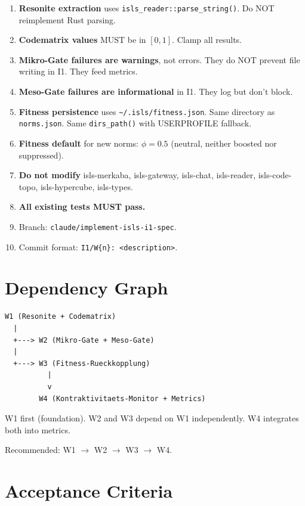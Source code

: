 \documentclass[11pt,a4paper]{article}
\begin{document}
\begin{enumerate}
\item \textbf{Resonite extraction} uses \texttt{isls\_reader::parse\_string()}. 
      Do NOT reimplement Rust parsing.
\item \textbf{Codematrix values} MUST be in $[0, 1]$. Clamp all results.
\item \textbf{Mikro-Gate failures are warnings}, not errors. They 
      do NOT prevent file writing in I1. They feed metrics.
\item \textbf{Meso-Gate failures are informational} in I1. 
      They log but don't block.
\item \textbf{Fitness persistence} uses \texttt{\textasciitilde/.isls/fitness.json}. 
      Same directory as \texttt{norms.json}. Same 
      \texttt{dirs\_path()} with USERPROFILE fallback.
\item \textbf{Fitness default} for new norms: $\phi = 0.5$ 
      (neutral, neither boosted nor suppressed).
\item \textbf{Do not modify} isls-merkaba, isls-gateway, isls-chat, 
      isls-reader, isls-code-topo, isls-hypercube, isls-types.
\item \textbf{All existing tests MUST pass.}
\item Branch: \texttt{claude/implement-isls-i1-spec}.
\item Commit format: \texttt{I1/W\{n\}: <description>}.
\end{enumerate}


\section{Dependency Graph}

\begin{verbatim}
W1 (Resonite + Codematrix)
  |
  +---> W2 (Mikro-Gate + Meso-Gate)
  |
  +---> W3 (Fitness-Rueckkopplung)
          |
          v
        W4 (Kontraktivitaets-Monitor + Metrics)
\end{verbatim}

W1 first (foundation). W2 and W3 depend on W1 independently. 
W4 integrates both into metrics.

Recommended: W1 $\to$ W2 $\to$ W3 $\to$ W4.


\section{Acceptance Criteria}
\end{document}
